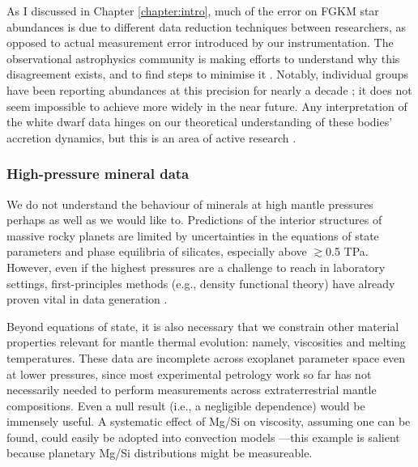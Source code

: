 As I discussed in Chapter \ref{chapter:intro}, much of the error on FGKM star abundances is due to different data reduction techniques between researchers, as opposed to actual measurement error introduced by our instrumentation. The observational astrophysics community is making efforts to understand why this disagreement exists, and to find steps to minimise it \citep{hinkel_comparison_2016}. Notably, individual groups have been reporting abundances at this precision for nearly a decade \citep[e.g.,][]{ramirez_chemical_2014, nissen_highprecision_2015, spina_planet_2016}; it does not seem impossible to achieve more widely in the near future. Any interpretation of the white dwarf data hinges on our theoretical understanding of these bodies' accretion dynamics, but this is an area of active research \citep[e.g.,][]{harrison_bayesian_2021, buchan_planets_2022, brouwers_asynchronous_2022, brouwers_asynchronous_2023}.


\subsubsection{High-pressure mineral data}

We do not understand the behaviour of minerals at high mantle pressures perhaps as well as we would like to. Predictions of the interior structures of massive rocky planets are limited by uncertainties in the equations of state parameters and phase equilibria of silicates, especially above $\gtrsim$0.5 TPa. However, even if the highest pressures are a challenge to reach in laboratory settings, first-principles methods (e.g., density functional theory) have already proven vital in data generation \citep[e.g.,][]{umemoto_twostage_2011, tackley_mantle_2013, sakai_experimental_2016, umemoto_phase_2017}. %


Beyond equations of state, it is also necessary that we constrain other material properties relevant for mantle thermal evolution: namely, viscosities and melting temperatures. These data are incomplete across exoplanet parameter space even at lower pressures, since most experimental petrology work so far has not necessarily needed to perform measurements across extraterrestrial mantle compositions. Even a null result (i.e., a negligible dependence) would be immensely useful. A systematic effect of Mg/Si on viscosity, assuming one can be found, could easily be adopted into convection models \citep{spaargaren_influence_2020}---this example is salient because planetary Mg/Si distributions might be measureable.

